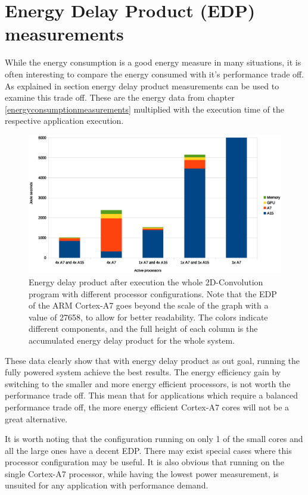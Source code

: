 \section{Energy Delay Product (EDP) measurements} \label{EDP}
While the energy consumption is a good energy measure in many situations, it is often interesting to compare the energy consumed with it's performance trade off.
As explained in section  energy delay product measurements can be used to examine this trade off.
These are the energy data from chapter \ref{energyconsumptionmeasurements} multiplied with the execution time of the respective application execution.

\begin{figure}[H]
  \centering
  \includegraphics[width=160mm]{fig/EDP-configurations.eps}
  \caption{Energy delay product after execution the whole 2D-Convolution program with different processor configurations. Note that the EDP of the ARM Cortex-A7 goes beyond the scale of the graph with a value of 27658, to allow for better readability. The colors indicate different components, and the full height of each column is the accumulated energy delay product for the whole system.\label{overflow}} \label {EDP-configurations}
\end{figure}

These data clearly show that with energy delay product as out goal, running the fully powered system achieve the best results.
The energy efficiency gain by switching to the smaller and more energy efficient processors, is not worth the performance trade off.
This mean that for applications which require a balanced performance trade off, the more energy efficient Cortex-A7 cores will not be a great alternative.

It is worth noting that the configuration running on only 1 of the small cores and all the large ones have a decent EDP.
There may exist special cases where this processor configuration may be useful.
It is also obvious that running on the single Cortex-A7 processor, while having the lowest power measurement, is unsuited for any application with performance demand.

